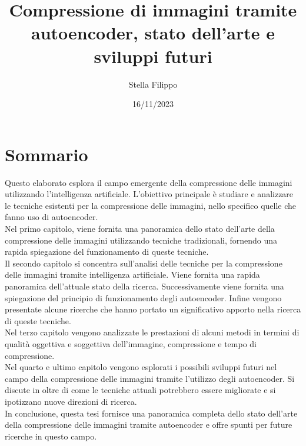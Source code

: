 \documentclass[12pt,a4paper,twoside,openright]{extreport}
\title{Compressione di immagini tramite autoencoder, stato dell’arte e sviluppi futuri}
\author{Stella Filippo}
\date{16/11/2023}
\begin{document}
    \pagestyle{empty} %

    
    \cleardoublepage
    
    
    \cleardoublepage

    \pagestyle{plain} %

    \chapter*{Sommario}
    Questo elaborato esplora il campo emergente della compressione delle immagini utilizzando l'intelligenza artificiale. L’obiettivo principale è studiare e analizzare le tecniche esistenti per la compressione delle immagini, nello specifico quelle che fanno uso di autoencoder.\\
    Nel primo capitolo, viene fornita una panoramica dello stato dell’arte della compressione delle immagini utilizzando tecniche tradizionali, fornendo una rapida spiegazione del funzionamento di queste tecniche.\\
    Il secondo capitolo si concentra sull’analisi delle tecniche per la compressione delle immagini tramite intelligenza artificiale. Viene fornita una rapida panoramica dell'attuale stato della ricerca. Successivamente viene fornita una spiegazione del principio di funzionamento degli autoencoder. Infine vengono presentate alcune ricerche che hanno portato un significativo apporto nella ricerca di queste tecniche.\\
    Nel terzo capitolo vengono analizzate le prestazioni di alcuni metodi in termini di qualità oggettiva e soggettiva dell'immagine, compressione e tempo di compressione.\\ 
    Nel quarto e ultimo capitolo vengono esplorati i possibili sviluppi futuri nel campo della compressione delle immagini tramite l'utilizzo degli autoencoder. Si discute in oltre di come le tecniche attuali potrebbero essere migliorate e si ipotizzano nuove direzioni di ricerca.\\
    In conclusione, questa tesi fornisce una panoramica completa dello stato dell’arte della compressione delle immagini tramite autoencoder e offre spunti per future ricerche in questo campo.\\

    \cleardoublepage

    \tableofcontents
    \cleardoublepage
    
    \listoffigures
    \cleardoublepage 

    \setcounter{figure}{0} %
    
    
    
    
    
    
    
    \cleardoublepage

    \printbibliography[heading=bibintoc]
\end{document}

